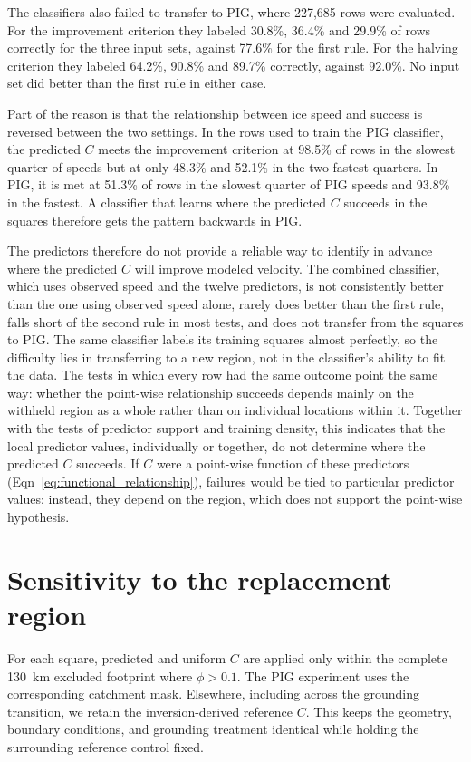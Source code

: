 \documentclass[review,jog]{igs}
\begin{document}
The classifiers also failed to transfer to PIG, where 227,685 rows were
evaluated. For the improvement criterion they labeled 30.8\%, 36.4\% and
29.9\% of rows correctly for the three input sets, against 77.6\% for the first
rule. For the halving criterion they labeled 64.2\%, 90.8\% and
89.7\% correctly, against 92.0\%. No input set did better than the first rule
in either case.

Part of the reason is that the relationship between ice speed and success is
reversed between the two settings. In the rows used to train the PIG
classifier, the predicted $C$ meets the improvement criterion at 98.5\% of rows
in the slowest quarter of speeds but at only 48.3\% and 52.1\% in the two
fastest quarters. In PIG, it is met at 51.3\% of rows in the slowest quarter of
PIG speeds and 93.8\% in the fastest. A classifier that learns where the
predicted $C$ succeeds in the squares therefore gets the pattern backwards in
PIG.

The predictors therefore do not provide a reliable way to identify in advance
where the predicted $C$ will improve modeled velocity. The combined classifier,
which uses observed speed and the twelve predictors, is not consistently better
than the one using observed speed alone, rarely does better than the first
rule, falls short of the second rule in most tests, and does not transfer from
the squares to PIG. The same classifier labels its training squares almost perfectly, so the
difficulty lies in transferring to a new region, not in the classifier's
ability to fit the data. The tests in which every row had the same outcome point the same way: whether
the point-wise relationship succeeds depends mainly on the withheld region as
a whole rather than on individual locations within it. Together with the tests of predictor support and training density, this
indicates that the local predictor values, individually or together, do not
determine where the predicted $C$ succeeds. If $C$ were a point-wise function
of these predictors (Eqn~\ref{eq:functional_relationship}), failures would be
tied to particular predictor values; instead, they depend on the region, which
does not support the point-wise hypothesis.


\section{Sensitivity to the replacement region}
\label{app:replacement_sensitivity}

For each square, predicted and uniform $C$ are applied only within the complete 130~km
excluded footprint where $\phi>0.1$. The PIG experiment uses the corresponding catchment mask. Elsewhere, including across the grounding transition, we retain the inversion-derived reference $C$. This keeps the geometry,
boundary conditions, and grounding treatment identical while holding the
surrounding reference control fixed.
\end{document}
